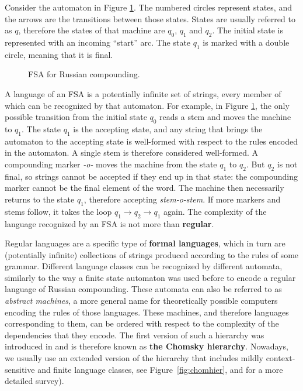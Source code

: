 Consider the automaton in Figure \ref{fig:ruscompounding}.
The numbered circles represent states, and the arrows are the transitions between those states.
States are usually referred to as $q$, therefore the states of that machine are $q_0$, $q_1$ and $q_2$. 
The initial state is represented with an incoming ``start'' arc.
The state $q_1$ is marked with a double circle, meaning that it is final.


\begin{figure}[h!]
\centering
{}
\caption{FSA for Russian compounding.}
\label{fig:ruscompounding}
\end{figure}


A language of an FSA is a potentially infinite set of strings, every member of which can be recognized by that automaton.
For example, in Figure \ref{fig:ruscompounding}, the only possible transition from the initial state $q_0$ reads a stem and moves the machine to $q_1$.
The state $q_1$ is the accepting state, and any string that brings the automaton to the accepting state is well-formed with respect to the rules encoded in the automaton.
A single stem is therefore considered well-formed.
A compounding marker \emph{-o-} moves the machine from the state $q_1$ to $q_2$.
But $q_2$ is not final, so strings cannot be accepted if they end up in that state: the compounding marker cannot be the final element of the word.
The machine then necessarily returns to the state $q_1$, therefore accepting \emph{stem-o-stem}.
If more markers and stems follow, it takes the loop $q_1\rightarrow q_2\rightarrow q_1$ again.
The complexity of the language recognized by an FSA is not more than \textbf{regular}.


Regular languages are a specific type of \textbf{formal languages}, which in turn are (potentially infinite) collections of strings produced according to the rules of some grammar.
Different language classes can be recognized by different automata, similarly to the way a finite state automaton was used before to encode a regular language of Russian compounding.
These automata can also be referred to as \emph{abstract machines}, a more general name for theoretically possible computers encoding the rules of those languages.
These machines, and therefore languages corresponding to them, can be ordered with respect to the complexity of the dependencies that they encode.
The first version of such a hierarchy was introduced in \cite{Chomsky1956} and is therefore known as \textbf{the Chomsky hierarchy}.
Nowadays, we usually use an extended version of the hierarchy that includes mildly context-sensitive and finite language classes, see Figure~\ref{fig:chomhier}, and \cite{JagerRogers12} for a more detailed survey).




